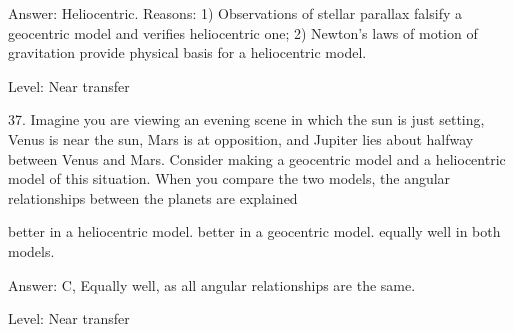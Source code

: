 Answer: Heliocentric. Reasons: 1) Observations of stellar parallax falsify a geocentric model and verifies heliocentric one; 2) Newton's laws of motion of gravitation provide physical basis for a heliocentric model.

Level: Near transfer

37. Imagine you are viewing an evening scene in which the sun is just setting, Venus is near the sun, Mars is at opposition, and Jupiter lies about halfway between Venus and Mars. Consider making a geocentric model and a heliocentric model of this situation. When you compare the two models, the angular relationships between the planets are explained

    better in a heliocentric model.
    better in a geocentric model.
    equally well in both models. 

Answer: C, Equally well, as all angular relationships are the same.

Level: Near transfer
